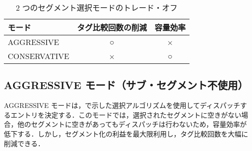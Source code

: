 \begin{table}[tb]
  \caption{2 つのセグメント選択モードのトレード・オフ}
  \footnotesize
  \center
   \begin{tabular}{l|c|c} \hline \hline
   モード & タグ比較回数の削減 & 容量効率 \\ \hline
   AGGRESSIVE & ○ & × \\
   CONSERVATIVE & × & ○ \\ \hline
  \end{tabular}
  \label{tab:switch_trade_off}
\end{table}

\subsection{AGGRESSIVE モード（サブ・セグメント不使用）}
AGGRESSIVE モードは，で示した選択アルゴリズムを使用してディスパッチするエントリを決定する．このモードでは，選択されたセグメントに空きがない場合，他のセグメントに空きがあってもディスパッチは行わないため，容量効率が低下する．しかし，セグメント化の利益を最大限利用し，タグ比較回数を大幅に削減できる．

